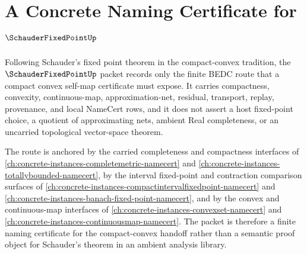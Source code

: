 \chapter{A Concrete Naming Certificate for $\SchauderFixedPointUp$}
\label{ch:concrete-instances-schauder-fixed-point-namecert}

Following Schauder's fixed point theorem in the compact-convex tradition, the $\SchauderFixedPointUp$ packet records only the finite BEDC route that a compact convex self-map certificate must expose. It carries compactness, convexity, continuous-map, approximation-net, residual, transport, replay, provenance, and local NameCert rows, and it does not assert a host fixed-point choice, a quotient of approximating nets, ambient Real completeness, or an uncarried topological vector-space theorem.

The route is anchored by the carried completeness and compactness interfaces of \autoref{ch:concrete-instances-completemetric-namecert} and \autoref{ch:concrete-instances-totallybounded-namecert}, by the interval fixed-point and contraction comparison surfaces of \autoref{ch:concrete-instances-compactintervalfixedpoint-namecert} and \autoref{ch:concrete-instances-banach-fixed-point-namecert}, and by the convex and continuous-map interfaces of \autoref{ch:concrete-instances-convexset-namecert} and \autoref{ch:concrete-instances-continuousmap-namecert}. The packet is therefore a finite naming certificate for the compact-convex handoff rather than a semantic proof object for Schauder's theorem in an ambient analysis library.

